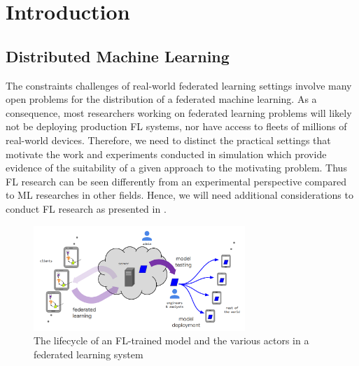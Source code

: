 \documentclass{article}
\begin{document}



\section{Introduction}

\subsection{Distributed Machine Learning}
The constraints challenges of real-world federated learning settings involve many open problems for the distribution of a federated machine learning. As a consequence, most researchers working on federated learning problems will likely not be deploying production FL systems, nor have access to fleets of millions of real-world devices. Therefore, we need to distinct the practical settings that motivate the work and experiments conducted in simulation which provide evidence of the suitability of a given approach to the motivating problem. Thus FL research can be seen differently from an experimental perspective compared to ML researches in other fields. Hence,  we will need additional considerations to conduct FL research as presented in \cite{kairouz_advances_2021}.
\begin{figure}[!ht]
    \centering
    \includegraphics[width=8cm]{assets/structureFL.PNG}
    \caption{The lifecycle of an FL-trained model and the various actors in a federated learning system}
    \label{ Structure FL}
\end{figure}
\end{document}
